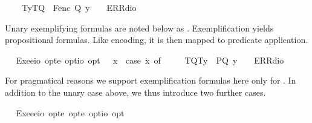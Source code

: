 \begin{isabellebody}
\ \ \ \ {\isacharparenleft}T{\isacharparenleft}y{\isacharparenright}{\isacharcomma}T{\isacharparenleft}Q{\isacharparenright}{\isacharparenright}\ {\isasymRightarrow}\ F{\isacharparenleft}enc\ Q\ y{\isacharparenright}\ {\isacharbar}\ {\isacharunderscore}\ {\isasymRightarrow}\ ERR{\isacharparenleft}dio{\isacharparenright}{\isachardoublequoteclose}%
\begin{isamarkuptext}%
Unary exemplifying formulas  are noted below as .  
  Exemplification yields propositional formulas. Like encoding, it is then mapped to predicate application.%
\end{isamarkuptext}%
\isamarkuptrue%
\ \isamarkupfalse%
\ Exe{}{\isacharcolon}{\isacharcolon}{\isachardoublequoteopen}{\isacharparenleft}e{\isasymRightarrow}io{\isacharparenright}\ opt{\isasymRightarrow}e\ opt{\isasymRightarrow}io\ opt{\isachardoublequoteclose}\ {\isacharparenleft}{\isachardoublequoteopen}{\isasymlparr}{\isacharunderscore}{\isacharcomma}{\isacharunderscore}{\isasymrparr}{\isachardoublequoteclose}{\isacharparenright}\ \ {\isachardoublequoteopen}{\isasymlparr}{\isasymPhi}{\isacharcomma}x{\isasymrparr}\ {\isasymequiv}\ case\ {\isacharparenleft}{\isasymPhi}{\isacharcomma}x{\isacharparenright}\ of\ \isanewline
\ \ \ \ {\isacharparenleft}T{\isacharparenleft}Q{\isacharparenright}{\isacharcomma}T{\isacharparenleft}y{\isacharparenright}{\isacharparenright}\ {\isasymRightarrow}\ P{\isacharparenleft}Q\ y{\isacharparenright}\ {\isacharbar}\ {\isacharunderscore}\ {\isasymRightarrow}\ ERR{\isacharparenleft}dio{\isacharparenright}{\isachardoublequoteclose}%
\begin{isamarkuptext}%
For pragmatical reasons we support exemplification formulas  here only for .
 In addition to the unary case above, we thus introduce two further cases.%
\end{isamarkuptext}%
\isamarkuptrue%
\ \isamarkupfalse%
\ Exe{}{\isacharcolon}{\isacharcolon}{\isachardoublequoteopen}{\isacharparenleft}e{\isasymRightarrow}e{\isasymRightarrow}io{\isacharparenright}\ opt{\isasymRightarrow}e\ opt{\isasymRightarrow}e\ opt{\isasymRightarrow}io\ opt{\isachardoublequoteclose}\ {\isacharparenleft}{\isachardoublequoteopen}{\isasymlparr}{\isacharunderscore}{\isacharcomma}{\isacharunderscore}{\isacharcomma}{\isacharunderscore}{\isasymrparr}{\isachardoublequoteclose}{\isacharparenright}\isanewline

\end{isabellebody}
